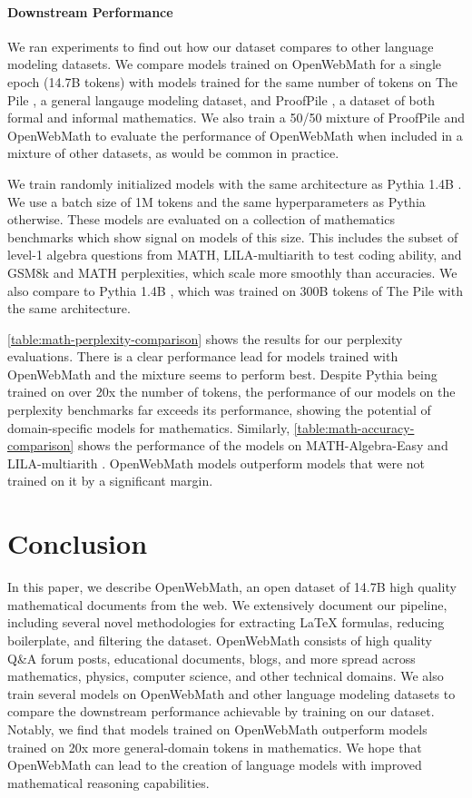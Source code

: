 \paragraph{Downstream Performance}
\label{sec:models}
We ran experiments to find out how our dataset compares to other language modeling datasets. We compare models trained on OpenWebMath for a single epoch (14.7B tokens) with models trained for the same number of tokens on The Pile \citep{gao2020pile}, a general langauge modeling dataset, and ProofPile \citep{azerbayev2023proofnet}, a dataset of both formal and informal mathematics. We also train a 50/50 mixture of ProofPile and OpenWebMath to evaluate the performance of OpenWebMath when included in a mixture of other datasets, as would be common in practice.

We train randomly initialized models with the same architecture as Pythia 1.4B \citep{pythia}. We use a batch size of 1M tokens and the same hyperparameters as Pythia otherwise. These models are evaluated on a collection of mathematics benchmarks which show signal on models of this size. This includes the subset of level-1 algebra questions from MATH, LILA-multiarith to test coding ability, and GSM8k and MATH perplexities, which scale more smoothly than accuracies. We also compare to Pythia 1.4B \citep{pythia}, which was trained on 300B tokens of The Pile \citep{gao2020pile} with the same architecture.

\autoref{table:math-perplexity-comparison} shows the results for our perplexity evaluations. There is a clear performance lead for models trained with OpenWebMath and the mixture seems to perform best. Despite Pythia being trained on over 20x the number of tokens, the performance of our models on the perplexity benchmarks far exceeds its performance, showing the potential of domain-specific models for mathematics. Similarly, \autoref{table:math-accuracy-comparison} shows the performance of the models on MATH-Algebra-Easy and LILA-multiarith \citep{lila}. OpenWebMath models outperform models that were not trained on it by a significant margin.

\section{Conclusion}

In this paper, we describe OpenWebMath, an open dataset of 14.7B high quality mathematical documents from the web. We extensively document our pipeline, including several novel methodologies for extracting \LaTeX{} formulas, reducing boilerplate, and filtering the dataset. OpenWebMath consists of high quality Q\&A forum posts, educational documents, blogs, and more spread across mathematics, physics, computer science, and other technical domains. We also train several models on OpenWebMath and other language modeling datasets to compare the downstream performance achievable by training on our dataset. Notably, we find that models trained on OpenWebMath outperform models trained on 20x more general-domain tokens in mathematics. We hope that OpenWebMath can lead to the creation of language models with improved mathematical reasoning capabilities.


